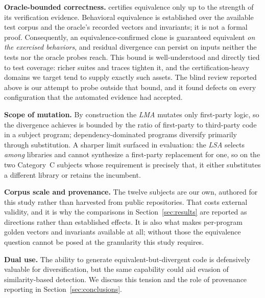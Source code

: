 \textbf{Oracle-bounded correctness.}
\sys certifies equivalence only up to the strength of its verification evidence. Behavioral equivalence is established over the available test corpus and the oracle's recorded vectors and invariants; it is not a formal proof. Consequently, an equivalence-confirmed clone is guaranteed equivalent \emph{on the exercised behaviors}, and residual divergence can persist on inputs neither the tests nor the oracle probes reach. This bound is well-understood and directly tied to test coverage: richer suites and traces tighten it, and the certification-heavy domains we target tend to supply exactly such assets. The blind review reported above is our attempt to probe outside that bound, and it found defects on every configuration that the automated evidence had accepted.

\textbf{Scope of mutation.}
By construction the \emph{LMA} mutates only first-party logic, so the divergence \sys achieves is bounded by the ratio of first-party to third-party code in a subject program; dependency-dominated programs diversify primarily through substitution. A sharper limit surfaced in evaluation: the \emph{LSA} selects \emph{among} libraries and cannot synthesize a first-party replacement for one, so on the two Category~C subjects whose requirement is precisely that, it either substitutes a different library or retains the incumbent.

\textbf{Corpus scale and provenance.}
The twelve subjects are our own, authored for this study rather than harvested from public repositories. That costs external validity, and it is why the comparisons in Section~\ref{sec:results} are reported as directions rather than established effects. It is also what makes per-program golden vectors and invariants available at all; without those the equivalence question cannot be posed at the granularity this study requires.

\textbf{Dual use.}
The ability to generate equivalent-but-divergent code is defensively valuable for diversification, but the same capability could aid evasion of similarity-based detection. We discuss this tension and the role of provenance reporting in Section~\ref{sec:conclusions}.
